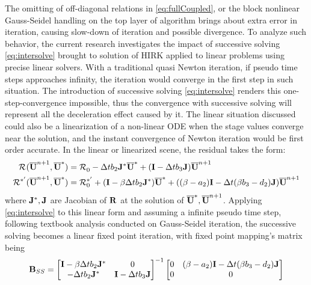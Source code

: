 \documentclass[preprint,12pt]{elsarticle}
\begin{document}
The omitting of off-diagonal relations in \eqref{eq:fullCoupled},
or the block nonlinear Gauss-Seidel handling on the top layer of
algorithm brings about extra error in iteration,
causing slow-down of iteration and possible divergence.
To analyze such behavior, the current research investigates
the impact of successive solving \eqref{eq:intersolve}
brought to solution of HIRK applied to linear problems
using precise linear solvers.
With a traditional quasi Newton iteration,
if pseudo time steps approaches infinity,
the iteration would converge in the first step in such
situation.
The introduction of successive solving \eqref{eq:intersolve}
renders this one-step-convergence impossible, thus
the convergence with successive solving will represent
all the deceleration effect caused by it.
The linear situation discussed could also be a linearization
of a non-linear ODE when the stage values converge near the
solution, and the instant convergence of Newton iteration would
be first order accurate.
In the linear or linearized scene,
the residual takes the form:
\begin{equation}
    \label{eq:linearized}
    \begin{aligned}
        \mathcal{R}^{}(\overline{\mathbf{U}}^{n+1},\overline{\mathbf{U}}^{*})   & =
        \mathcal{R}^{}_0 - \mathrm\Delta t b_2\mathbf{J}^*\overline{\mathbf{U}}^{*} + (\mathbf{I} - \mathrm\Delta t b_3\mathbf{J})\overline{\mathbf{U}}^{n+1} \\
        \mathcal{R}^{*'}(\overline{\mathbf{U}}^{n+1},\overline{\mathbf{U}}^{*}) & =
        \mathcal{R}^{*'}_0 + (\mathbf{I} - \beta\mathrm\Delta t b_2\mathbf{J}^*)\overline{\mathbf{U}}^{*}
        + ((\beta-a_2)\mathbf{I} - \mathrm\Delta t (\beta b_3 - d_2)\mathbf{J})\overline{\mathbf{U}}^{n+1}
    \end{aligned}
\end{equation}
where $\mathbf{J}^*, \mathbf{J}$ are Jacobian of $\mathbf{R}$
at the solution of
$\overline{\mathbf{U}}^{*}, \overline{\mathbf{U}}^{n+1}$.
Applying \eqref{eq:intersolve} to
this linear form and assuming a infinite pseudo
time step,
following textbook analysis conducted on
Gauss-Seidel iteration,
the successive solving becomes a linear
fixed point iteration, with fixed point
mapping's matrix being
\begin{equation}
    \mathbf{B}_{SS}=\begin{bmatrix}
        \mathbf{I} - \beta\mathrm\Delta t b_2\mathbf{J}^* & 0                   \\
        - \mathrm\Delta t b_2\mathbf{J}^*           & \mathbf{I} - \mathrm\Delta t b_3\mathbf{J} \\
    \end{bmatrix}^{-1}
    \begin{bmatrix}
        0 & (\beta-a_2)\mathbf{I} - \mathrm\Delta t (\beta b_3 - d_2)\mathbf{J} \\
        0 & 0                                            \\
    \end{bmatrix}
\end{equation}
\end{document}
